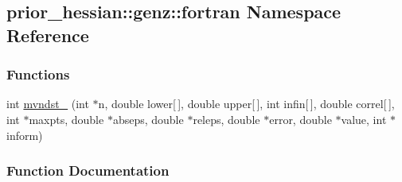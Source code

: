 \hypertarget{namespaceprior__hessian_1_1genz_1_1fortran}{}\subsection{prior\+\_\+hessian\+:\+:genz\+:\+:fortran Namespace Reference}
\label{namespaceprior__hessian_1_1genz_1_1fortran}
\subsubsection*{Functions}
\begin{DoxyCompactItemize}
\item 
int \hyperlink{namespaceprior__hessian_1_1genz_1_1fortran_a3aa3e81ace64048700679aa6ab8f0879}{mvndst\+\_\+} (int $\ast$n, double lower\mbox{[}$\,$\mbox{]}, double upper\mbox{[}$\,$\mbox{]}, int infin\mbox{[}$\,$\mbox{]}, double correl\mbox{[}$\,$\mbox{]}, int $\ast$maxpts, double $\ast$abseps, double $\ast$releps, double $\ast$error, double $\ast$value, int $\ast$inform)
\end{DoxyCompactItemize}


\subsubsection{Function Documentation}
